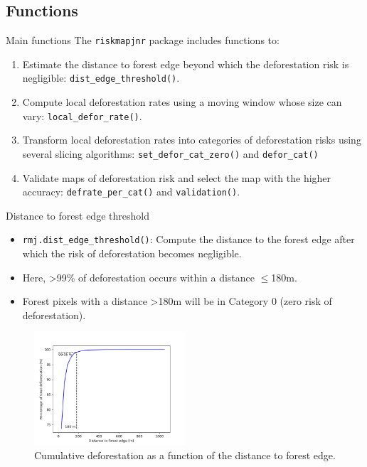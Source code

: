\documentclass[10pt,table,dvipsnames,compress]{beamer}
\begin{document}
\subsection{Functions}
\label{sec:org52bc4ec}

\begin{frame}[label={sec:org2363939},fragile]{Main functions}
 The \texttt{riskmapjnr} package includes functions to:

\begin{enumerate}
\item Estimate the distance to forest edge beyond which the deforestation risk is negligible:
\texttt{dist\_edge\_threshold()}.
\item Compute local deforestation rates using a moving window whose size can vary:
\texttt{local\_defor\_rate()}.
\item Transform local deforestation rates into categories of deforestation risks using several slicing algorithms:
\texttt{set\_defor\_cat\_zero()} and \texttt{defor\_cat()}
\item Validate maps of deforestation risk and select the map with the higher accuracy:
\texttt{defrate\_per\_cat()} and \texttt{validation()}.
\end{enumerate}
\end{frame}

\begin{frame}[label={sec:orgbfc836f},fragile]{Distance to forest edge threshold}
 \begin{itemize}
\item \texttt{rmj.dist\_edge\_threshold()}: Compute the distance to the forest edge after which the risk of deforestation becomes negligible.
\item Here, >99\% of deforestation occurs within a distance \(\le\)180m.
\item Forest pixels with a distance >180m will be in Category 0 (zero risk of deforestation).
\end{itemize}

\begin{figure}[htbp]
\centering
\includegraphics[width=0.5\textwidth]{figs/perc_dist.png}
\caption{\label{fig:orgf9f8f80}Cumulative deforestation as a function of the distance to forest edge.}
\end{figure}
\end{frame}
\end{document}
